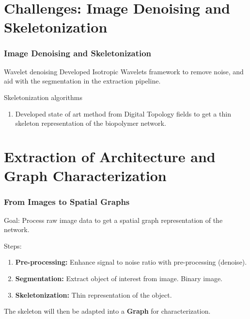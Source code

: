 \documentclass[9pt]{beamer}
\begin{document}
\section{Challenges: Image Denoising and Skeletonization}
\begin{frame}[t]
  \frametitle{Image Denoising and Skeletonization}
    \vspace{0.8cm}
    \begin{exampleblock}{Wavelet denoising}
      Developed Isotropic Wavelets framework to remove noise, and aid with the segmentation in the extraction pipeline.
    \end{exampleblock}
    \vspace{0.8cm}
    \begin{exampleblock}{Skeletonization algorithms}
      \begin{enumerate}
        \item Developed state of art method from Digital Topology fields to get a thin skeleton representation of the biopolymer network.
      \end{enumerate}
    \end{exampleblock}
    \vspace{1cm}
\end{frame}

\section{Extraction of Architecture and Graph Characterization}
\begin{frame}[t]
  \frametitle{From Images to Spatial Graphs}
    \begin{alertblock}{Goal:}
        Process raw image data to get a spatial graph representation of the network.
    \end{alertblock}
    \vspace{0.8cm}
    \begin{exampleblock}{Steps:}
      \begin{enumerate}
        \item \textbf{Pre-processing:} Enhance signal to noise ratio with pre-processing (denoise).
        \item \textbf{Segmentation:} Extract object of interest from image. Binary image.
        \item \textbf{Skeletonization:} Thin representation of the object.
      \end{enumerate}
    \end{exampleblock}
    \vspace{1cm}
    The skeleton will then be adapted into a \textbf{Graph} for characterization.
\end{frame}
\end{document}
